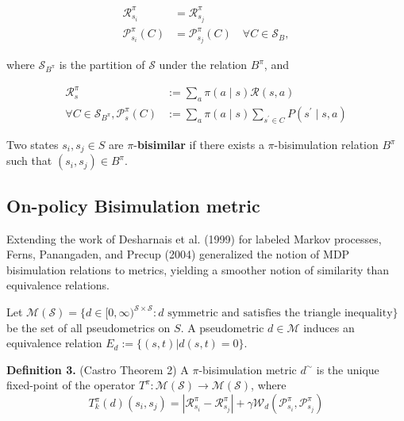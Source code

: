
\begin{equation}
\begin{aligned}
\mathcal{R}_{s_i}^\pi & = \mathcal{R}_{s_j}^\pi
 \\
\mathcal{P}_{s_i}^\pi\left(C \right) & =\mathcal{P}_{s_j}^\pi\left(C\right) \quad \forall C \in \mathcal{S}_B,
\end{aligned}
\end{equation}

where $\mathcal{S}_{B^\pi}$ is the partition of $\mathcal{S}$ under the relation $B^\pi$, and

\begin{equation}
\begin{aligned}
\mathcal{R}_s^\pi & :=\sum_a \pi(a \mid s) \mathcal{R}(s, a) \\
\forall C \in \mathcal{S}_{B^\pi}, \mathcal{P}_s^\pi(C) & :=\sum_a \pi(a \mid s) \sum_{s^{\prime} \in C} P( s^{\prime} \mid s, a)
\end{aligned}
\end{equation}

Two states $s_i, s_j \in S$ are $\pi$-\textbf{bisimilar} if there exists a $\pi$-bisimulation relation $B^\pi$ such that $(s_i, s_j) \in B^\pi$.


\subsection{On-policy Bisimulation metric}

Extending the work of Desharnais et al. (1999) for labeled Markov processes, Ferns, Panangaden, and Precup (2004) generalized the notion of MDP bisimulation relations to metrics, yielding a smoother notion of similarity than equivalence relations. 


Let $\mathcal{M(S)}= \{d \in [0, \infty)^{\mathcal{S} \times \mathcal{S}} : d \text{ symmetric and satisfies the triangle inequality}\}$ be the set of all pseudometrics on $S$. A pseudometric $d \in \mathcal{M}$ induces an equivalence relation $E_d := \{(s, t)|d(s, t) = 0\}$. \newline

\textbf{Definition 3.} (Castro \cite{castro2020scalable} Theorem 2) A $\pi$-bisimulation metric $d^\sim$ is the unique fixed-point of the operator $T^\pi : \mathcal{M(S)} \rightarrow \mathcal{M(S)}$, where 
\begin{equation}
    T^\pi_k(d)(s_i, s_j) = |\mathcal{R}^\pi_{s_i} - \mathcal{R}^\pi_{s_j}| + \gamma \mathcal{W}_d(\mathcal{P}^\pi_{s_i},\mathcal{P}^\pi_{s_j}) 
\end{equation}

